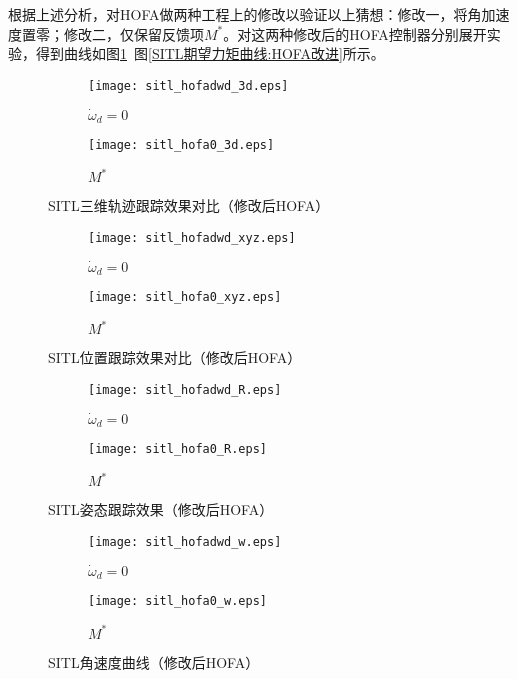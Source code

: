 根据上述分析，对HOFA做两种工程上的修改以验证以上猜想：修改一，将角加速度置零；修改二，仅保留反馈项$M^*$。对这两种修改后的HOFA控制器分别展开实验，得到曲线如图\ref{SITL三维轨迹跟踪效果对比:HOFA改进}~图\ref{SITL期望力矩曲线:HOFA改进}所示。
\begin{figure}[H]
  \centering
  \begin{subfigure}[b]{0.49\linewidth}
      \texttt{[image: sitl\_hofadwd\_3d.eps]}
      \caption{$\dot \omega_d =0$}
  \end{subfigure}
  \hfill %
  \begin{subfigure}[b]{0.49\linewidth}
      \texttt{[image: sitl\_hofa0\_3d.eps]}
      \caption{$M^*$}
  \end{subfigure}
  \caption{SITL三维轨迹跟踪效果对比（修改后HOFA）}
  \label{SITL三维轨迹跟踪效果对比:HOFA改进}
\end{figure}
  \begin{figure}[H]
    \centering
  \begin{subfigure}[b]{0.49\linewidth}
      \texttt{[image: sitl\_hofadwd\_xyz.eps]}
      \caption{$\dot \omega_d =0$}
  \end{subfigure}
  \hfill
  \begin{subfigure}[b]{0.49\linewidth}
      \texttt{[image: sitl\_hofa0\_xyz.eps]}
      \caption{$M^*$}
  \end{subfigure}
  \caption{SITL位置跟踪效果对比（修改后HOFA）}
  \label{SITL位置跟踪效果对比:HOFA改进}
\end{figure}
\begin{figure}[H]
  \centering
\begin{subfigure}[b]{0.49\linewidth}
    \texttt{[image: sitl\_hofadwd\_R.eps]}
    \caption{$\dot \omega_d =0$}
\end{subfigure}
\hfill
\begin{subfigure}[b]{0.49\linewidth}
    \texttt{[image: sitl\_hofa0\_R.eps]}
    \caption{$M^*$}
\end{subfigure}
\caption{SITL姿态跟踪效果（修改后HOFA）}
\label{SITL姿态跟踪效果:HOFA改进}
\end{figure}
\begin{figure}[H]
  \centering
\begin{subfigure}[b]{0.49\linewidth}
    \texttt{[image: sitl\_hofadwd\_w.eps]}
    \caption{$\dot \omega_d =0$}
\end{subfigure}
\hfill
\begin{subfigure}[b]{0.49\linewidth}
    \texttt{[image: sitl\_hofa0\_w.eps]}
    \caption{$M^*$}
\end{subfigure}
\caption{SITL角速度曲线（修改后HOFA）}
\label{SITL角速度曲线:HOFA改进}
\end{figure}
